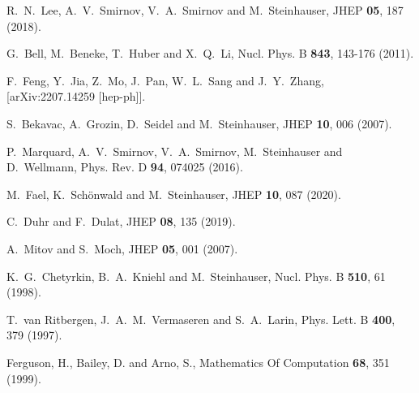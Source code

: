 \documentclass[onecolumn,preprintnumbers,aps,superscriptaddress,nofootinbib,prd,notitlepage]{revtex4-1}
\begin{document}
{\begin{thebibliography}{99}
R.~N.~Lee, A.~V.~Smirnov, V.~A.~Smirnov and M.~Steinhauser,
JHEP \textbf{05}, 187 (2018).


G.~Bell, M.~Beneke, T.~Huber and X.~Q.~Li,
Nucl. Phys. B \textbf{843}, 143-176 (2011).


F.~Feng, Y.~Jia, Z.~Mo, J.~Pan, W.~L.~Sang and J.~Y.~Zhang,
[arXiv:2207.14259 [hep-ph]].

S.~Bekavac, A.~Grozin, D.~Seidel and M.~Steinhauser,
JHEP \textbf{10}, 006 (2007).

P.~Marquard, A.~V.~Smirnov, V.~A.~Smirnov, M.~Steinhauser and D.~Wellmann,
Phys. Rev. D \textbf{94}, 074025 (2016).

M.~Fael, K.~Sch\"onwald and M.~Steinhauser,
JHEP \textbf{10}, 087 (2020).


C.~Duhr and F.~Dulat,
JHEP \textbf{08}, 135 (2019).

A.~Mitov and S.~Moch,
JHEP \textbf{05}, 001 (2007).

K.~G.~Chetyrkin, B.~A.~Kniehl and M.~Steinhauser,
Nucl. Phys. B \textbf{510}, 61 (1998).

T.~van Ritbergen, J.~A.~M.~Vermaseren and S.~A.~Larin,
Phys. Lett. B \textbf{400}, 379 (1997).

Ferguson, H., Bailey, D. and Arno, S.,
Mathematics Of Computation \textbf{68}, 351 (1999).


\end{thebibliography}}
\end{document}
